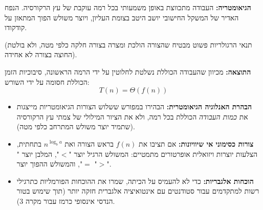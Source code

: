 \documentclass[11pt, a4paper]{article}
\begin{document}
\textbf{הגיאומטריה:} העבודה מתכווצת באופן משמעותי בכל רמה עוקבת של עץ הרקורסיה. הנפח האדיר של המשקל החישובי יושב היטב בצומת העליון, ויוצר משולש הפוך המתאזן על קודקודו.

(תנאי הרגולריות פשוט מבטיח שהצורה הולכת ומצרה בצורה חלקה כלפי מטה, ולא בולטת החוצה בצורה לא אחידה).

\textbf{התוצאה:} מכיוון שהעבודה הכוללת נשלטת לחלוטין על ידי הרמה הראשונה, סיבוכיות הזמן הכוללת חסומה על ידי השורש:
\begin{equation*}
    T(n) = \Theta(f(n))
\end{equation*}

\vspace{0.5cm}
\begin{center}
\end{center}

\vspace{1cm}
\begin{educatortip}
\begin{itemize}
    \item \textbf{הבהרת האנלוגיה הגיאומטרית:} הבהירו במפורש ששלוש הצורות הגיאומטריות מייצגות את \textit{כמות העבודה} הכוללת בכל רמה, ולא את הציור המילולי של צמתי עץ הרקורסיה (שתמיד יוצר משולש המתרחב כלפי מטה).
    \item \textbf{צורות כסימוני אי שיוויונות:} אם תציבו את $f(n)$ בראש הצורה ואת $n^{\log_b a}$ בתחתית, הצלעות יוצרות ויזואלית אופרטורים מתמטיים: המשולש הרגיל יוצר "$<$", המלבן יוצר "$=$", והמשולש ההפוך יוצר "$>$".
    \item \textbf{הוכחות אלגבריות:} כדי לא להעמיס על הכיתה, שמרו את ההוכחות הפורמליות כתרגילי רשות למתקדמים עבור סטודנטים עם אינטואיציה אלגברית חזקה יותר (תוך שימוש בטור הנדסי אינסופי כרמז עבור מקרה 3).
\end{itemize}
\end{educatortip}
\end{document}
